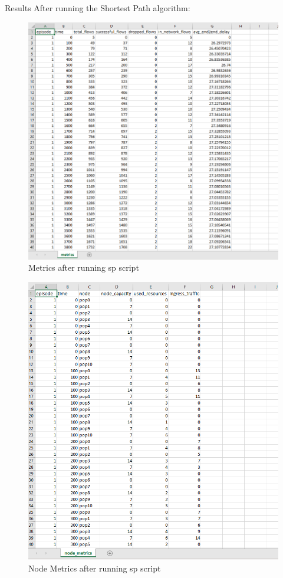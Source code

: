 Results After running the Shortest Path algorithm:

\begin{figure}[h]
    \centering
    \includegraphics[width=1\textwidth]{spmetrics}
    \caption{Metrics after running sp script}
    \label{fig:spmetrics}
\end{figure}


\begin{figure}[h]
    \centering
    \includegraphics[width=1\textwidth]{spnodemetrics}
    \caption{Node Metrics after running sp script}
    \label{fig:spnodemetrics}
\end{figure}


